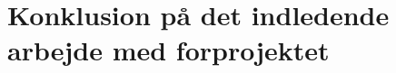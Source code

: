 \documentclass[Main]{subfiles}
\begin{document}
\chapter{Konklusion på det indledende arbejde med forprojektet}
\end{document}
